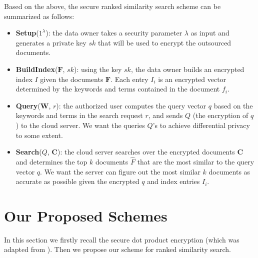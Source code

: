 \documentclass{IEEEtran}
\begin{document}
Based on the above, the secure ranked similarity search scheme can be summarized as follows:
\begin{itemize}
\item \textbf{Setup}($1^\lambda$): the data owner takes a security parameter $\lambda$ as input and generates a private key $sk$ that will be used to encrypt the outsourced documents.
\item \textbf{BuildIndex}($\mathbf{F}$, $sk$): using the key $sk$, the data owner builds an encrypted index $I$ given the documents $\mathbf{F}$. Each entry $I_i$ is an encrypted vector determined by the keywords and terms contained in the document $f_i$.
\item \textbf{Query}($\mathbf{W}$, $r$): the authorized user computes the query vector $q$ based on the keywords and terms in the search request $r$, and sends $Q$ (the encryption of $q$) to the cloud server. We want the queries $Q$'s to achieve differential privacy to some extent.
\item \textbf{Search}($Q$, $\mathbf{C}$): the cloud server searches over the encrypted documents $\mathbf{C}$ and determines the top $k$ documents $\hat{F}$ that are the most similar to the query vector $q$. We want the server can figure out the most similar $k$ documents as accurate as possible given the encrypted $q$ and index entries $I_i$.
\end{itemize}

\section{Our Proposed Schemes}
In this section we firstly recall the secure dot product encryption \cite{Cao14} (which was adapted from \cite{Wong09}). Then we propose our scheme for ranked similarity search.
\end{document}
